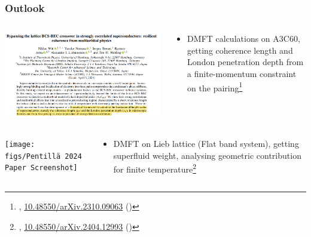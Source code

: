 \documentclass[aspectratio=169]{beamer}
\begin{document}
\begin{frame}
	\frametitle{Outlook}
	
	\begin{columns}[T]
		\begin{column}{0.5\textwidth}
			\begin{center}
				\includegraphics[width=\textwidth]{figs/Witt 2024 Paper Screenshot}
			\end{center}
		\end{column}
		\begin{column}{0.5\textwidth}
			\begin{itemize}
				\item DMFT calculations on A3C60, getting coherence length and London penetration depth from a finite-momentum constraint on the pairing\footnote[frame]{\citeauthor{wittBypassingLatticeBCSBEC2024}, \href{https://doi.org/10.48550/arXiv.2310.09063}{10.48550/arXiv.2310.09063} (\citeyear{wittBypassingLatticeBCSBEC2024})}
			\end{itemize}
		\end{column}
	\end{columns}
\end{frame}

\begin{frame}
	\begin{columns}[T]
		\begin{column}{0.5\textwidth}
			\begin{center}
				\texttt{[image: figs/Pentillä 2024 Paper Screenshot]}
			\end{center}
		\end{column}
		\begin{column}{0.5\textwidth}
			\begin{itemize}
				\item DMFT on Lieb lattice (Flat band system), getting superfluid weight, analysing geometric contribution for finite temperature\footnote[frame]{\citeauthor{penttilaFlatbandRatioQuantum2024}, \href{htts://doi.org/10.48550/arXiv.2404.12993}{10.48550/arXiv.2404.12993} (\citeyear{penttilaFlatbandRatioQuantum2024})}
			\end{itemize}
		\end{column}
	\end{columns}
\end{frame}
\end{document}
